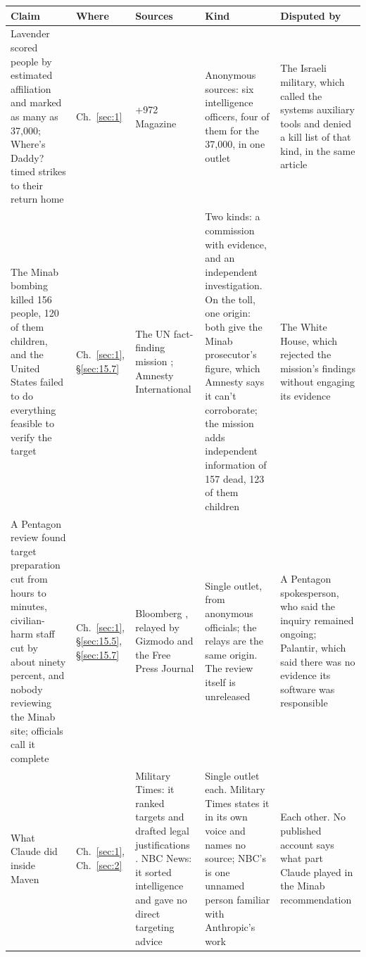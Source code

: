 \begingroup\small\renewcommand{\arraystretch}{1.12}
\begin{longtable}{@{}>{\raggedright\arraybackslash}p{}>{\raggedright\arraybackslash}p{}>{\raggedright\arraybackslash}p{}>{\raggedright\arraybackslash}p{}>{\raggedright\arraybackslash}p{}@{}}
\hline
\textbf{Claim} & \textbf{Where} & \textbf{Sources} & \textbf{Kind} & \textbf{Disputed by} \\
\hline
\endhead
Lavender scored people by estimated affiliation and marked as many as 37,000; Where's Daddy? timed strikes to their return home & Ch.~\ref{sec:1} & +972 Magazine \autocite{abraham2024lavender} & Anonymous sources: six intelligence officers, four of them for the 37,000, in one outlet & The Israeli military, which called the systems auxiliary tools and denied a kill list of that kind, in the same article \\ \hline
The Minab bombing killed 156 people, 120 of them children, and the United States failed to do everything feasible to verify the target & Ch.~\ref{sec:1}, \S\ref{sec:15.7} & The UN fact-finding mission \autocite{UNFFMIran2026}; Amnesty International \autocite{Amnesty2026Minab} & Two kinds: a commission with evidence, and an independent investigation. On the toll, one origin: both give the Minab prosecutor's figure, which Amnesty says it can't corroborate; the mission adds independent information of 157 dead, 123 of them children & The White House, which rejected the mission's findings without engaging its evidence \autocite{rferl2026whitehouseun} \\ \hline
A Pentagon review found target preparation cut from hours to minutes, civilian-harm staff cut by about ninety percent, and nobody reviewing the Minab site; officials call it complete & Ch.~\ref{sec:1}, \S\ref{sec:15.5}, \S\ref{sec:15.7} & Bloomberg \autocite{Bloomberg2026KillChain}, relayed by Gizmodo and the Free Press Journal \autocite{gizmodo2026minab,fpj2026minabinquiry} & Single outlet, from anonymous officials; the relays are the same origin. The review itself is unreleased & A Pentagon spokesperson, who said the inquiry remained ongoing; Palantir, which said there was no evidence its software was responsible \autocite{fpj2026minabinquiry} \\ \hline
What Claude did inside Maven & Ch.~\ref{sec:1}, Ch.~\ref{sec:2} & Military Times: it ranked targets and drafted legal justifications \autocite{livingstone2026maven}. NBC News: it sorted intelligence and gave no direct targeting advice \autocite{nbc2026targeting} & Single outlet each. Military Times states it in its own voice and names no source; NBC's is one unnamed person familiar with Anthropic's work & Each other. No published account says what part Claude played in the Minab recommendation \\ \hline

\end{longtable}

